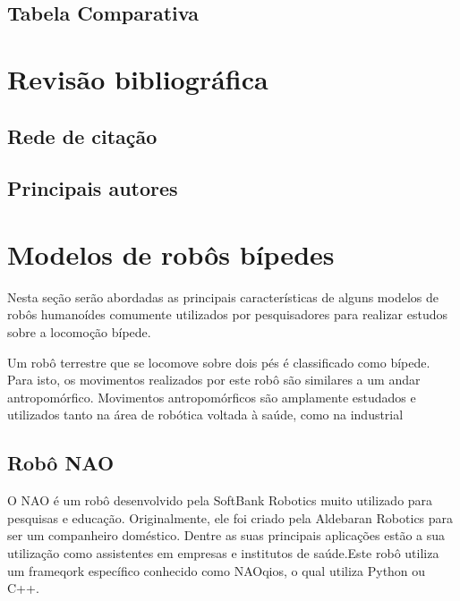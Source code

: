 \subsection{Tabela Comparativa}
\label{ssec:tabela}







\section{Revisão bibliográfica}
\label{sec:biblio}

\subsection{Rede de citação}
\label{ssec:rede}

\subsection{Principais autores}
\label{ssec:autor}


\section{Modelos de robôs bípedes}
\label{sec:modelos}

Nesta seção serão abordadas as principais características de alguns modelos de robôs humanoídes comumente utilizados por pesquisadores para realizar estudos sobre a locomoção bípede.

Um robô terrestre que se locomove sobre dois pés é classificado como bípede. Para isto, os movimentos realizados por este robô são similares a um andar antropomórfico. Movimentos antropomórficos são amplamente estudados e utilizados tanto na área de robótica voltada à saúde, como na industrial

\subsection{Robô NAO}
\label{ssec:nao}

O NAO é um robô desenvolvido pela SoftBank Robotics muito utilizado para pesquisas e educação. Originalmente, ele foi criado pela Aldebaran Robotics para ser um companheiro doméstico. Dentre as suas principais aplicações estão a sua utilização como assistentes em empresas e institutos de saúde.Este robô utiliza um frameqork específico conhecido como NAOqios, o qual utiliza Python ou C++.  

